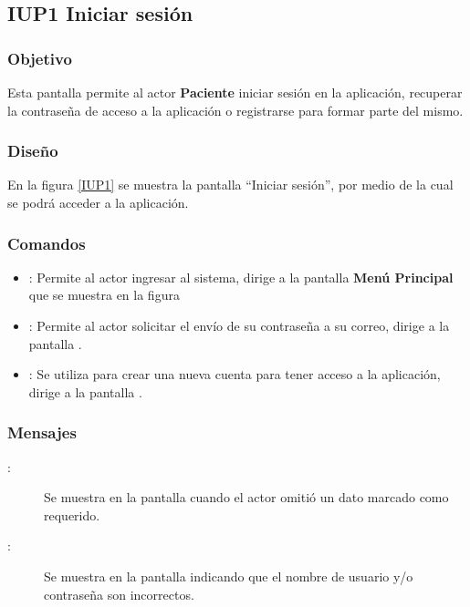 \subsection{IUP1 Iniciar sesión}
 
\subsubsection{Objetivo}

    Esta pantalla permite al actor \textbf{Paciente} iniciar sesión en la aplicación, recuperar la contraseña de acceso a la aplicación o registrarse para formar parte del mismo.

\subsubsection{Diseño}

    En la figura \ref{IUP1} se muestra la pantalla ``Iniciar sesión'', por medio de la cual se podrá acceder a la aplicación. \\


\subsubsection{Comandos}
\begin{itemize}
    \item {}: Permite al actor ingresar al sistema, dirige a la pantalla \textbf{Menú Principal} que se muestra en la figura %
    \item {}: Permite al actor solicitar el envío de su contraseña a su correo, dirige a la pantalla .
    \item {}: Se utiliza para crear una nueva cuenta para tener acceso a la aplicación, dirige a la pantalla .
\end{itemize}

\subsubsection{Mensajes}

\begin{description}
    \item[:] Se muestra en la pantalla  cuando el actor omitió un dato marcado como requerido.
    \item[:] Se muestra en la pantalla  indicando que el nombre de usuario y/o contraseña son incorrectos.
\end{description}
